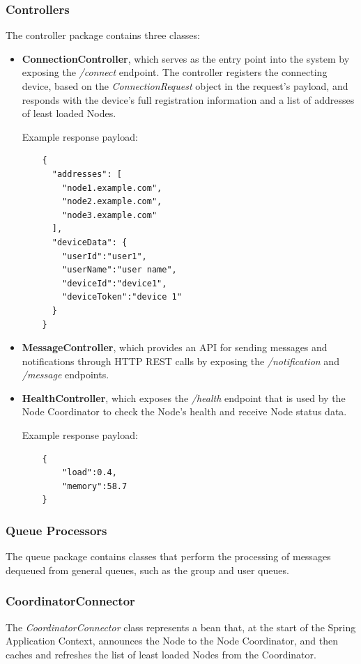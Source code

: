 \subsubsection*{Controllers}
The controller package contains three classes: 
\begin{itemize}
    \item \textbf{ConnectionController}, which  serves as the entry point into the system by exposing the \textit{/connect} endpoint. The controller registers the connecting device, based on the \textit{ConnectionRequest} object in the request's payload, and responds with the device's full registration information and a list of addresses of least loaded Nodes.
    
    Example response payload:
    \begin{lstlisting}
    {
      "addresses": [
        "node1.example.com",
        "node2.example.com",
        "node3.example.com"
      ],
      "deviceData": {
        "userId":"user1",
        "userName":"user name",
        "deviceId":"device1",
        "deviceToken":"device 1"
      }
    }
    \end{lstlisting}
    
    \item \textbf{MessageController}, which provides an API for sending messages and notifications through HTTP REST calls by exposing the \textit{/notification} and \textit{/message} endpoints.
    
    \clearpage
    
    \item \textbf{HealthController}, which exposes the \textit{/health} endpoint that is used by the Node Coordinator to check the Node's health and receive Node status data.
    
    Example response payload:
    \begin{lstlisting}
    {
        "load":0.4,
        "memory":58.7
    }
    \end{lstlisting}
\end{itemize}

\subsubsection*{Queue Processors}
The queue package contains classes that perform the processing of messages dequeued from general queues, such as the group and user queues.

\subsubsection*{CoordinatorConnector}
The \textit{CoordinatorConnector} class represents a bean that, at the start of the Spring Application Context, announces the Node to the Node Coordinator, and then caches and refreshes the list of least loaded Nodes from the Coordinator.

